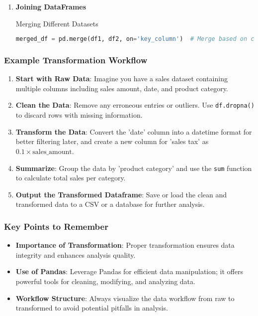 \documentclass[aspectratio=169]{beamer}
\begin{document}
\begin{frame}[fragile]
\begin{enumerate}
        \item \textbf{Joining DataFrames}
          \begin{block}{Merging Different Datasets}
              \begin{lstlisting}[language=Python]
merged_df = pd.merge(df1, df2, on='key_column')  # Merge based on common key
              \end{lstlisting}
          \end{block}
    \end{enumerate}
\end{frame}

\begin{frame}
    \frametitle{Example Transformation Workflow}
    \begin{enumerate}
        \item \textbf{Start with Raw Data}: 
          Imagine you have a sales dataset containing multiple columns including sales amount, date, and product category.

        \item \textbf{Clean the Data}: 
          Remove any erroneous entries or outliers. Use \texttt{df.dropna()} to discard rows with missing information.

        \item \textbf{Transform the Data}: 
          Convert the 'date' column into a datetime format for better filtering later, and create a new column for 'sales tax' as \(0.1 \times \text{sales\_amount}\).

        \item \textbf{Summarize}: 
          Group the data by 'product category' and use the \texttt{sum} function to calculate total sales per category.

        \item \textbf{Output the Transformed Dataframe}: 
          Save or load the clean and transformed data to a CSV or a database for further analysis.
    \end{enumerate}
\end{frame}

\begin{frame}
    \frametitle{Key Points to Remember}
    \begin{itemize}
        \item \textbf{Importance of Transformation}: Proper transformation ensures data integrity and enhances analysis quality.
        \item \textbf{Use of Pandas}: Leverage Pandas for efficient data manipulation; it offers powerful tools for cleaning, modifying, and analyzing data.
        \item \textbf{Workflow Structure}: Always visualize the data workflow from raw to transformed to avoid potential pitfalls in analysis.
    \end{itemize}
\end{frame}
\end{document}
